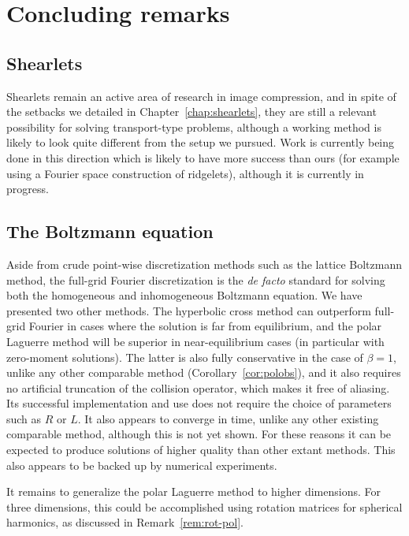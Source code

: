 \chapter{Concluding remarks}

\section{Shearlets}

Shearlets remain an active area of research in image compression, and in spite of the setbacks we detailed in
Chapter~\ref{chap:shearlets}, they are still a relevant possibility for solving transport-type problems,
although a working method is likely to look quite different from the setup we pursued.  Work is currently
being done in this direction which is likely to have more success than ours (for example \cite{ObermeierXX}
using a Fourier space construction of ridgelets), although it is currently in progress.

\section{The Boltzmann equation}

Aside from crude point-wise discretization methods such as the lattice Boltzmann method, the full-grid Fourier
discretization is the {\em de facto} standard for solving both the homogeneous and inhomogeneous Boltzmann
equation. We have presented two other methods. The hyperbolic cross method can outperform full-grid Fourier in
cases where the solution is far from equilibrium, and the polar Laguerre method will be superior in
near-equilibrium cases (in particular with zero-moment solutions). The latter is also fully conservative in
the case of $\beta=1$, unlike any other comparable method (Corollary~\ref{cor:polobs}), and it also requires
no artificial truncation of the collision operator, which makes it free of aliasing. Its successful
implementation and use does not require the choice of parameters such as $R$ or $L$. It also appears to
converge in time, unlike any other existing comparable method, although this is not yet shown. For these
reasons it can be expected to produce solutions of higher quality than other extant methods. This also appears
to be backed up by numerical experiments.

It remains to generalize the polar Laguerre method to higher dimensions. For three dimensions, this could be
accomplished using rotation matrices for spherical harmonics, as discussed in Remark~\ref{rem:rot-pol}.
